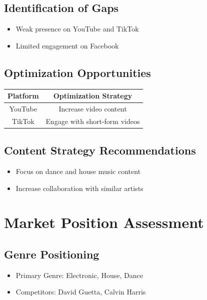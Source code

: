 \documentclass{report}
\begin{document}
\subsection{Identification of Gaps}

\begin{itemize}
    \item Weak presence on YouTube and TikTok
    \item Limited engagement on Facebook
\end{itemize}

\subsection{Optimization Opportunities}

\begin{tabular}{|c|c|}
    \hline
    \textbf{Platform} & \textbf{Optimization Strategy} \\
    \hline
    YouTube & Increase video content \\
    TikTok & Engage with short-form videos \\
    \hline
\end{tabular}

\subsection{Content Strategy Recommendations}

\begin{itemize}
    \item Focus on dance and house music content
    \item Increase collaboration with similar artists
\end{itemize}

\newpage

\section{Market Position Assessment}

\subsection{Genre Positioning}

\begin{itemize}
    \item Primary Genre: Electronic, House, Dance
    \item Competitors: David Guetta, Calvin Harris
\end{itemize}
\end{document}

